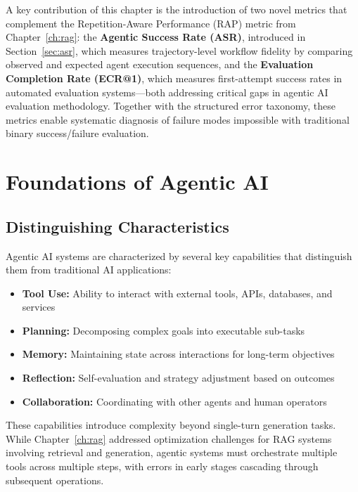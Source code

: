 A key contribution of this chapter is the introduction of two novel metrics that complement the Repetition-Aware Performance (RAP) metric from Chapter~\ref{ch:rag}: the \textbf{Agentic Success Rate (ASR)}, introduced in Section~\ref{sec:asr}, which measures trajectory-level workflow fidelity by comparing observed and expected agent execution sequences, and the \textbf{Evaluation Completion Rate (ECR@1)}, which measures first-attempt success rates in automated evaluation systems---both addressing critical gaps in agentic AI evaluation methodology. Together with the structured error taxonomy, these metrics enable systematic diagnosis of failure modes impossible with traditional binary success/failure evaluation.

\section{Foundations of Agentic AI}
\label{sec:agentic_foundations}

\subsection{Distinguishing Characteristics}

Agentic AI systems are characterized by several key capabilities that distinguish them from traditional AI applications:

\begin{itemize}[leftmargin=*]
    \item \textbf{Tool Use:} Ability to interact with external tools, APIs, databases, and services
    \item \textbf{Planning:} Decomposing complex goals into executable sub-tasks
    \item \textbf{Memory:} Maintaining state across interactions for long-term objectives
    \item \textbf{Reflection:} Self-evaluation and strategy adjustment based on outcomes
    \item \textbf{Collaboration:} Coordinating with other agents and human operators
\end{itemize}

These capabilities introduce complexity beyond single-turn generation tasks. While Chapter~\ref{ch:rag} addressed optimization challenges for RAG systems involving retrieval and generation, agentic systems must orchestrate multiple tools across multiple steps, with errors in early stages cascading through subsequent operations.

